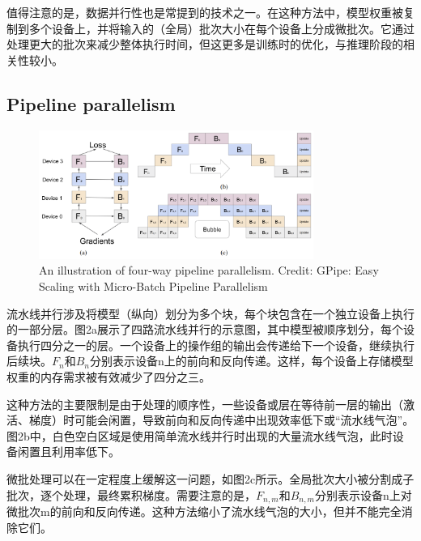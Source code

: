 \documentclass[twocolumn, 10pt]{article} %
\theoremstyle{remark}
\begin{document}
值得注意的是，数据并行性也是常提到的技术之一。在这种方法中，模型权重被复制到多个设备上，并将输入的（全局）批次大小在每个设备上分成微批次。它通过处理更大的批次来减少整体执行时间，但这更多是训练时的优化，与推理阶段的相关性较小。

\subsection{Pipeline parallelism}
\begin{figure}[ht]
    \centering
    \includegraphics[width=0.8\textwidth]{four-way-pipeline-parallelism.png}
    \caption{An illustration of four-way pipeline parallelism. Credit: GPipe: Easy Scaling with Micro-Batch Pipeline Parallelism}
\end{figure}

流水线并行涉及将模型（纵向）划分为多个块，每个块包含在一个独立设备上执行的一部分层。图2a展示了四路流水线并行的示意图，其中模型被顺序划分，每个设备执行四分之一的层。一个设备上的操作组的输出会传递给下一个设备，继续执行后续块。$F_n$和$B_n$分别表示设备n上的前向和反向传递。这样，每个设备上存储模型权重的内存需求被有效减少了四分之三。

这种方法的主要限制是由于处理的顺序性，一些设备或层在等待前一层的输出（激活、梯度）时可能会闲置，导致前向和反向传递中出现效率低下或“流水线气泡”。图2b中，白色空白区域是使用简单流水线并行时出现的大量流水线气泡，此时设备闲置且利用率低下。

微批处理可以在一定程度上缓解这一问题，如图2c所示。全局批次大小被分割成子批次，逐个处理，最终累积梯度。需要注意的是，$F_{n,m}$和$B_{n,m}$分别表示设备n上对微批次m的前向和反向传递。这种方法缩小了流水线气泡的大小，但并不能完全消除它们。
\end{document}
